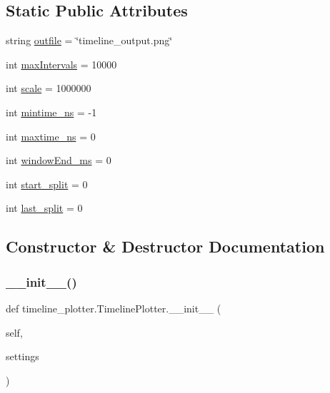 \subsection*{Static Public Attributes}
\begin{DoxyCompactItemize}
\item 
string \hyperlink{classtimeline__plotter_1_1TimelinePlotter_a87718d8e143d4dccb2f46bb1214d78a8}{outfile} = \char`\"{}timeline\+\_\+output.\+png\char`\"{}
\item 
int \hyperlink{classtimeline__plotter_1_1TimelinePlotter_adb5161bc067b217a5c66a4a1b0fd2213}{max\+Intervals} = 10000
\item 
int \hyperlink{classtimeline__plotter_1_1TimelinePlotter_a3b76314dd50cb56af6e53bd0cc26a10e}{scale} = 1000000
\item 
int \hyperlink{classtimeline__plotter_1_1TimelinePlotter_a32577307668e077b65ecbef0f77dcc67}{mintime\+\_\+ns} = -\/1
\item 
int \hyperlink{classtimeline__plotter_1_1TimelinePlotter_a679fbf02dad81f2f1944dee2b21849b6}{maxtime\+\_\+ns} = 0
\item 
int \hyperlink{classtimeline__plotter_1_1TimelinePlotter_a8f0545167faf8e1e7a50cd1cbc46833e}{window\+End\+\_\+ms} = 0
\item 
int \hyperlink{classtimeline__plotter_1_1TimelinePlotter_a86bf7ad2d0e35b803f6e87ced42f6b5b}{start\+\_\+split} = 0
\item 
int \hyperlink{classtimeline__plotter_1_1TimelinePlotter_ab8b503765a225eef1506c36572f7e761}{last\+\_\+split} = 0
\end{DoxyCompactItemize}


\subsection{Constructor \& Destructor Documentation}
\mbox{\label{classtimeline__plotter_1_1TimelinePlotter_a81ec370d3bf241c2401501fb77c3cb32}} 
\subsubsection{\texorpdfstring{\+\_\+\+\_\+init\+\_\+\+\_\+()}{\_\_init\_\_()}}
{\footnotesize\ttfamily def timeline\+\_\+plotter.\+Timeline\+Plotter.\+\_\+\+\_\+init\+\_\+\+\_\+ (\begin{DoxyParamCaption}\item[{}]{self,  }\item[{}]{settings }\end{DoxyParamCaption})}



